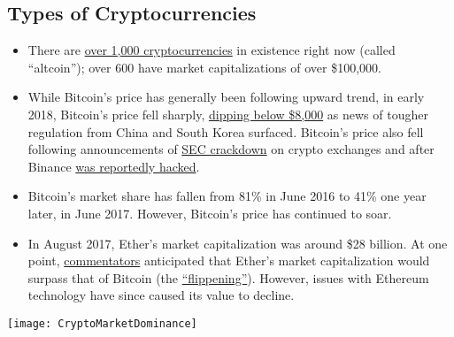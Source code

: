 \documentclass[11pt,fleqn,oneside]{book} %
\begin{document}
	\subsection{Types of Cryptocurrencies}
		\begin{itemize}
			\item There are \href{https://coinmarketcap.com/all/views/all/}{over 1,000 cryptocurrencies} in existence right now (called ``altcoin''); 
			over 600 have market capitalizations of over \$100,000.
			\item While Bitcoin’s price has generally been following upward trend, in early 2018, Bitcoin’s price fell sharply, 
			\href{https://www.cnbc.com/2018/02/05/bitcoin-price-drops-below-8000-over-60-billion-wiped-off-cryptocurrencies.html}{dipping below \$8,000} 
			as news of tougher regulation from China and South Korea surfaced. Bitcoin's price also fell 
			following announcements of \href{http://www.latimes.com/business/la-fi-bitcoin-sec-registration-20180307-story.html}{SEC crackdown} 
			on crypto exchanges and after Binance 
			\href{https://www.ft.com/content/58a32050-22aa-11e8-add1-0e8958b189ea}{was reportedly hacked}.
			\item Bitcoin’s market share has fallen from 81\% in June 2016 to 41\% one year later, in June 2017. 
			However, Bitcoin’s price has continued to soar.
			\item In August 2017, Ether’s market capitalization was around \$28 billion. At one point, 
			\href{http://www.zerohedge.com/news/2017-05-31/ethereum-forecast-surpass-bitcoin-2018}{commentators} anticipated that Ether’s market 
			capitalization would surpass that of Bitcoin (the 
			\href{https://www.flippening.watch/}{``flippening''}). 
			However, issues with Ethereum technology have since caused its value to decline.
		\end{itemize}
		\begin{center}
			\texttt{[image: CryptoMarketDominance]}
		\end{center}
\end{document}
